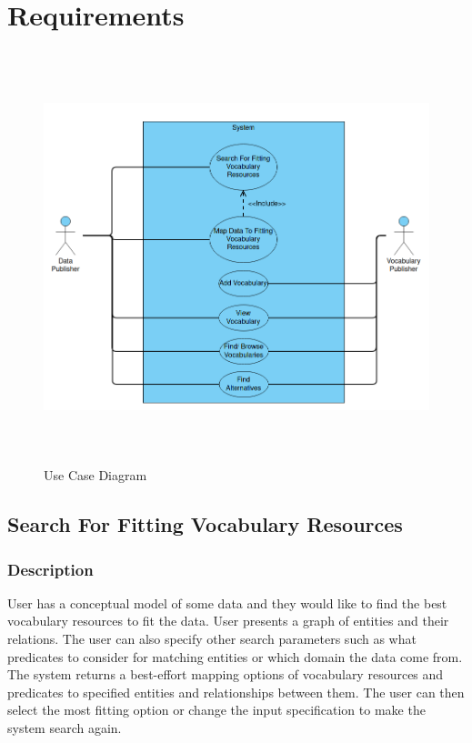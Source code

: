 \chapter{Requirements}
\begin{figure}[h!]\centering
\includegraphics[width=120mm, height=120mm]{../img/use-case-diagram.png}
\caption{Use Case Diagram}
\label{fig:use-case}
\end{figure}                            
\section{Search For Fitting Vocabulary Resources}
\label{sec:fit-vocab-res}

\subsection{Description}
User has a conceptual model of some data and they would like to find the best vocabulary resources to fit the data. User presents a graph of entities and their relations. The user can also specify other search parameters such as what predicates to consider for matching entities or which domain the data come from. The system returns a best-effort mapping options of vocabulary resources and predicates to specified entities and relationships between them. The user can then select the most fitting option or change the input specification to make the system search again. 

